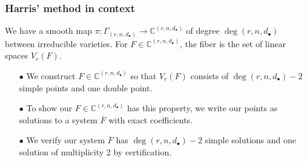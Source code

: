 \documentclass{beamer}
\theoremstyle{definition}
\begin{document}






\begin{frame}
\frametitle{Harris' method in context}
We have a smooth map $\pi:\Gamma_{(r,n,d_\bullet)}\to\mathbb{C}^{(r,n,d_\bullet)}$ of degree $\deg(r,n,d_\bullet)$ between irreducible varieties. For $F\in \mathbb{C}^{(r,n,d_\bullet)}$, the fiber is the set of linear spaces $V_r(F)$. 
\begin{enumerate}
\item[$\bullet$] We construct $F\in\mathbb{C}^{(r,n,d_\bullet)}$ so that $V_r(F)$ consists of $\deg(r,n,d_\bullet)-2$ simple points and one double point.

\item[$\bullet$] To show our $F\in\mathbb{C}^{(r,n,d_\bullet)}$ has this property, we write our points as solutions to a system $\overline{F}$ with exact coefficients.

\item[$\bullet$] We verify our system $\overline{F}$ has $\deg(r,n,d_\bullet)-2$ simple solutions and one solution of multiplicity 2 by certification.
\end{enumerate}
\end{frame}
\end{document}
